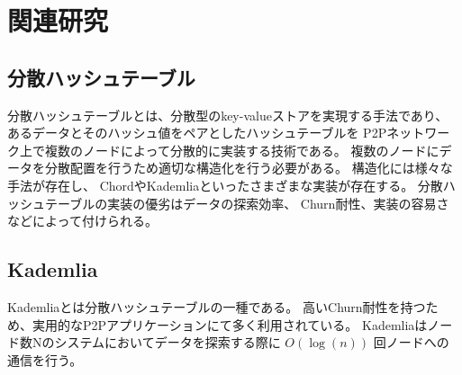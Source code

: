 \documentclass[sotsuron]{jcsie}
\begin{document}
\chapter{関連研究}
\section{分散ハッシュテーブル}
分散ハッシュテーブルとは、分散型のkey-valueストアを実現する手法であり、
あるデータとそのハッシュ値をペアとしたハッシュテーブルを
P2Pネットワーク上で複数のノードによって分散的に実装する技術である。
複数のノードにデータを分散配置を行うため適切な構造化を行う必要がある。
構造化には様々な手法が存在し、
ChordやKademliaといったさまざまな実装が存在する。
分散ハッシュテーブルの実装の優劣はデータの探索効率、
Churn耐性、実装の容易さなどによって付けられる。

\section{Kademlia}
Kademliaとは分散ハッシュテーブルの一種である。
高いChurn耐性を持つため、実用的なP2Pアプリケーションにて多く利用されている。
Kademliaはノード数Nのシステムにおいてデータを探索する際に
$O(\log(n))$ 回ノードへの通信を行う。
\end{document}
